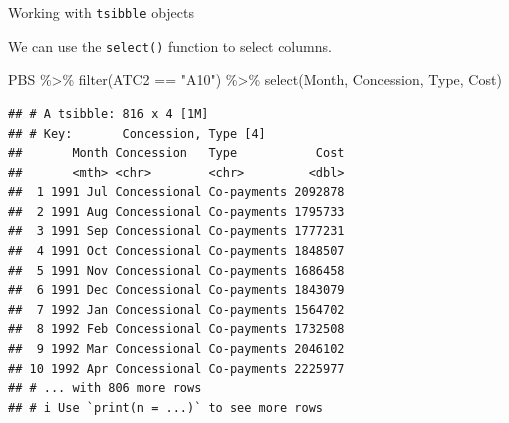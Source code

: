 \documentclass[14pt,ignorenonframetext,aspectratio=169]{beamer}
\newenvironment{Shaded}{\begin{snugshade}}{\end{snugshade}}
\newcommand{\FunctionTok}[1]{\textcolor[rgb]{0.00,0.00,0.00}{#1}}
\newcommand{\NormalTok}[1]{#1}
\newcommand{\SpecialCharTok}[1]{\textcolor[rgb]{0.00,0.00,0.00}{#1}}
\newcommand{\StringTok}[1]{\textcolor[rgb]{0.31,0.60,0.02}{#1}}
\renewenvironment{Shaded}{\color{black}\begin{snugshade}\color{black}}{\end{snugshade}}
\renewenvironment{Shaded}{\color{black}\fontsize{10}{10}\sf\begin{snugshade}\color{black}}{\end{snugshade}}
\begin{document}
\begin{frame}[fragile]{Working with \texttt{tsibble} objects}
\protect\hypertarget{working-with-tsibble-objects-2}{}
\fontsize{12}{14}\sf

We can use the \texttt{select()} function to select columns.

\fontsize{8}{10}\sf

\begin{Shaded}
\begin{Highlighting}[]
\NormalTok{PBS }\SpecialCharTok{\%\textgreater{}\%}
  \FunctionTok{filter}\NormalTok{(ATC2 }\SpecialCharTok{==} \StringTok{"A10"}\NormalTok{) }\SpecialCharTok{\%\textgreater{}\%}
  \FunctionTok{select}\NormalTok{(Month, Concession, Type, Cost)}
\end{Highlighting}
\end{Shaded}

\begin{verbatim}
## # A tsibble: 816 x 4 [1M]
## # Key:       Concession, Type [4]
##       Month Concession   Type           Cost
##       <mth> <chr>        <chr>         <dbl>
##  1 1991 Jul Concessional Co-payments 2092878
##  2 1991 Aug Concessional Co-payments 1795733
##  3 1991 Sep Concessional Co-payments 1777231
##  4 1991 Oct Concessional Co-payments 1848507
##  5 1991 Nov Concessional Co-payments 1686458
##  6 1991 Dec Concessional Co-payments 1843079
##  7 1992 Jan Concessional Co-payments 1564702
##  8 1992 Feb Concessional Co-payments 1732508
##  9 1992 Mar Concessional Co-payments 2046102
## 10 1992 Apr Concessional Co-payments 2225977
## # ... with 806 more rows
## # i Use `print(n = ...)` to see more rows
\end{verbatim}
\end{frame}
\end{document}
